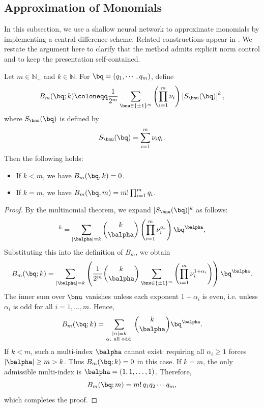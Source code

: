 \documentclass[11pt]{article}
\begin{document}
\subsection{Approximation of Monomials}
\label{subsec:app_monomial}
In this subsection, we use a shallow neural network to approximate monomials by implementing a central difference scheme. Related constructions appear in \citet{pinkus1999approximation}. We restate the argument here to clarify that the method admits explicit norm control and to keep the presentation self-contained.
\begin{lemma}
    Let $m \in \mathbb{N}_{+}$ and $k \in \mathbb{N}$. For $\bq = (q_1, \cdots, q_m)$, define
    \begin{equation*}
        B_m(\bq;k) \coloneqq  \frac{1}{2^m} \sum_{\bnu \in \{ \pm1\}^m} \left( \prod_{i=1}^m \nu_i\right) \left[ S_{\bnu}(\bq) \right]^k,
    \end{equation*}
    where $S_{\bnu}(\bq)$ is defined by 
    \begin{equation*}
        S_{\bnu}(\bq)= \sum_{i=1}^m \nu_i q_i.
    \end{equation*}
    Then the following holds: 
    \begin{itemize}
        \item If $k<m$,  we have $B_m(\bq, k) = 0$.
        \item If $k=m$, we have $B_m(\bq, m) = m ! \prod_{i=1}^m q_i$.
    \end{itemize}
    \label{lemma:monomials}
\end{lemma}
\begin{proof}
    By the multinomial theorem, we expand $[S_{\bnu}(\bq)]^k$ as follows:
    \begin{equation*}
        [S_{\bnu}(\bq)]^k = \sum_{|\balpha| = k} \binom{k}{ \balpha} \left( \prod_{i=1}^m \nu_i^{\alpha_i}\right) \bq^{\balpha},
    \end{equation*}
     Substituting this into the definition of $B_m$, we obtain
    \begin{equation*}
        B_m(\bq; k) = \sum_{|\balpha | = k} \left( \frac{1}{2^m} \binom{k}{\balpha} \sum_{\bnu \in \{ \pm1\}^m} \left( \prod_{i=1}^m \nu_i^{1 + \alpha_i} \right)\right) \bq^{\balpha}.
    \end{equation*}
     The inner sum over $\bnu$ vanishes unless each exponent $1+\alpha_i$ is even, i.e. unless $\alpha_i$ is odd for all $i=1,\dots,m$. Hence,
    \begin{equation*}
        B_m(\bq; k) = \sum_{\substack{|\alpha|=k \\ \alpha_{i} \text { all odd }}} \binom{k}{\balpha} \bq^{\balpha}.
    \end{equation*}
    If $k<m$, such a multi-index $\balpha$ cannot exist: requiring all $\alpha_i \geq 1$ forces $|\balpha| \geq m > k$. Thus $B_m(\bq;k)=0$ in this case. If $k=m$, the only admissible multi-index is $\balpha=(1,1,\dots,1)$. Therefore,
    \begin{equation*}
        B_m(\bq;m) 
        = m! \, q_1 q_2 \cdots q_m,
    \end{equation*}
    which completes the proof.
\end{proof}
\end{document}
